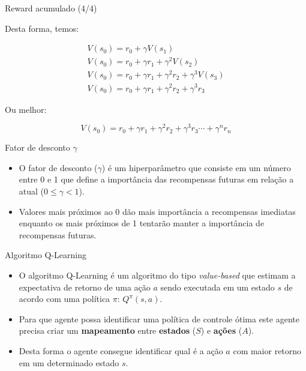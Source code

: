 \documentclass{beamer}
\begin{document}
\begin{frame}{Reward acumulado (4/4)}
	
	Desta forma, temos: 
	
	\begin{eqnarray}
		V(s_{0}) = r_{0} + \gamma V(s_{1}) \nonumber \\
		V(s_{0}) = r_{0} + \gamma r_{1} + \gamma^{2} V(s_{2}) \nonumber \\
		V(s_{0}) = r_{0} + \gamma r_{1} + \gamma^{2} r_{2} + \gamma^{3} V(s_{3}) \nonumber \\
		V(s_{0}) = r_{0} + \gamma r_{1} + \gamma^{2} r_{2} + \gamma^{3} r_{3} \nonumber
	\end{eqnarray}
	
	Ou melhor: 
	
	\begin{equation}
		V(s_{0}) = r_{0} + \gamma r_{1} + \gamma^{2} r_{2} + \gamma^{3} r_{3} \cdots + \gamma^{n}r_{n} \nonumber
	\end{equation}
	
	
\end{frame}


\begin{frame}{Fator de desconto $\gamma$}
	
	\begin{itemize}
		\item O fator de desconto ($\gamma$) é um hiperparâmetro que consiste 
		em um número entre 0 e 1 que define a importância das recompensas futuras 
		em relação a atual	($0 \leq \gamma < 1$).
		\item Valores mais próximos ao 0 dão mais importância a recompensas 
		imediatas enquanto os mais próximos de 1 tentarão manter a importância 
		de recompensas futuras.
	\end{itemize}
\end{frame}


\begin{frame}{Algoritmo Q-Learning}
	
	\begin{itemize}
		\item O algoritmo Q-Learning é um algoritmo do tipo \textit{value-based} que estimam a expectativa de retorno de uma ação $a$ sendo executada em um estado $s$ de acordo com uma política $\pi$: $Q^{\pi}(s,a)$.
		
		\item Para que agente possa identificar uma política de controle ótima este agente 
		precisa criar um \textbf{mapeamento} entre \textbf{estados} ($S$) e \textbf{ações} ($A$).
		
		\item Desta forma o agente consegue identificar qual é a ação $a$ com maior retorno em um determinado estado $s$. 
	\end{itemize}

\end{frame}
\end{document}
